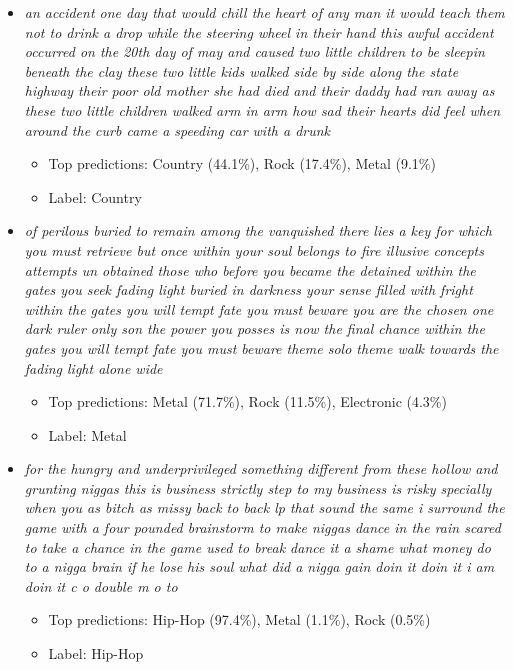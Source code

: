 \documentclass[12pt]{article}
\begin{document}
\begin{itemize}
	\item \textit{an accident one day that would chill the heart of any man it would teach them not to drink a drop while the steering wheel in their hand this awful accident occurred on the 20th day of may and caused two little children to be sleepin beneath the clay these two little kids walked side by side along the state highway their poor old mother she had died and their daddy had ran away as these two little children walked arm in arm how sad their hearts did feel when around the curb came a speeding car with a drunk }
	\begin{itemize}
		\item Top  predictions: Country (44.1\%), Rock (17.4\%), Metal (9.1\%)
		\item Label: Country
	\end{itemize}
	\item \textit{of perilous buried to remain among the vanquished there lies a key for which you must retrieve but once within your soul belongs to fire illusive concepts attempts un obtained those who before you became the detained within the gates you seek fading light buried in darkness your sense filled with fright within the gates you will tempt fate you must beware you are the chosen one dark ruler only son the power you posses is now the final chance within the gates you will tempt fate you must beware theme solo theme walk towards the fading light alone wide }
	\begin{itemize}
		\item Top  predictions: Metal (71.7\%), Rock (11.5\%), Electronic (4.3\%)
		\item Label: Metal
	\end{itemize}
	\item \textit{for the hungry and underprivileged something different from these hollow and grunting niggas this is business strictly step to my business is risky specially when you as bitch as missy back to back lp that sound the same i surround the game with a four pounded brainstorm to make niggas dance in the rain scared to take a chance in the game used to break dance it a shame what money do to a nigga brain if he lose his soul what did a nigga gain doin it doin it i am doin it c o double m o to}
	\begin{itemize}
		\item Top  predictions: Hip-Hop (97.4\%), Metal (1.1\%), Rock (0.5\%)
		\item Label: Hip-Hop
	\end{itemize}

\end{itemize}
\end{document}

